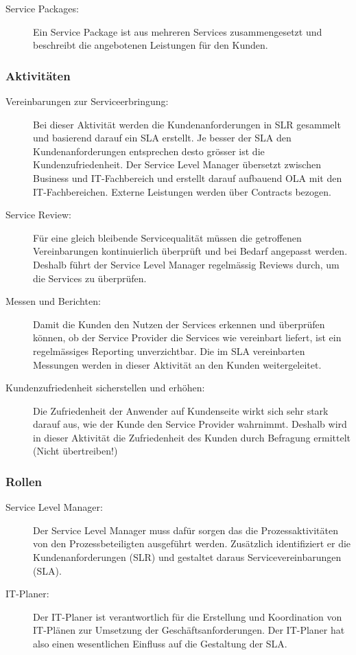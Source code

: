 \begin{description}
	\item[Service Packages:] Ein Service Package ist aus mehreren Services zusammengesetzt und beschreibt die angebotenen Leistungen für den Kunden.
\end{description}

\subsubsection{Aktivitäten}

\begin{description}
	\item[Vereinbarungen zur Serviceerbringung:] Bei dieser Aktivität werden die Kundenanforderungen in SLR gesammelt und basierend darauf ein SLA erstellt. Je besser der SLA den Kundenanforderungen entsprechen desto grösser ist die Kundenzufriedenheit. Der Service Level Manager übersetzt zwischen Business und IT-Fachbereich und erstellt darauf aufbauend OLA mit den IT-Fachbereichen. Externe Leistungen werden über Contracts bezogen.
	\item[Service Review:] Für eine gleich bleibende Servicequalität müssen die getroffenen Vereinbarungen kontinuierlich
	überprüft und bei Bedarf angepasst werden. Deshalb führt der Service Level Manager regelmässig Reviews durch, um die Services zu überprüfen.
	\item[Messen und Berichten:] Damit die Kunden den Nutzen der Services erkennen und überprüfen können, ob der Service
	Provider die Services wie vereinbart liefert, ist ein regelmässiges Reporting unverzichtbar. Die im SLA vereinbarten Messungen werden in dieser Aktivität an den Kunden weitergeleitet.
	\item[Kundenzufriedenheit sicherstellen und erhöhen:] Die Zufriedenheit der Anwender auf Kundenseite wirkt sich sehr stark darauf aus, wie der Kunde den Service Provider wahrnimmt. Deshalb wird in dieser Aktivität die Zufriedenheit des Kunden durch Befragung ermittelt (Nicht übertreiben!)
\end{description}

\subsubsection{Rollen}

\begin{description}
	\item[Service Level Manager:] Der Service Level Manager muss dafür sorgen das die Prozessaktivitäten von den Prozessbeteiligten ausgeführt werden. Zusätzlich identifiziert er die Kundenanforderungen (SLR) und gestaltet daraus Servicevereinbarungen (SLA).
	\item[IT-Planer:] Der IT-Planer ist verantwortlich für die Erstellung und Koordination von IT-Plänen zur Umsetzung der Geschäftsanforderungen. Der IT-Planer hat also einen wesentlichen Einfluss auf die Gestaltung der SLA.
\end{description}

